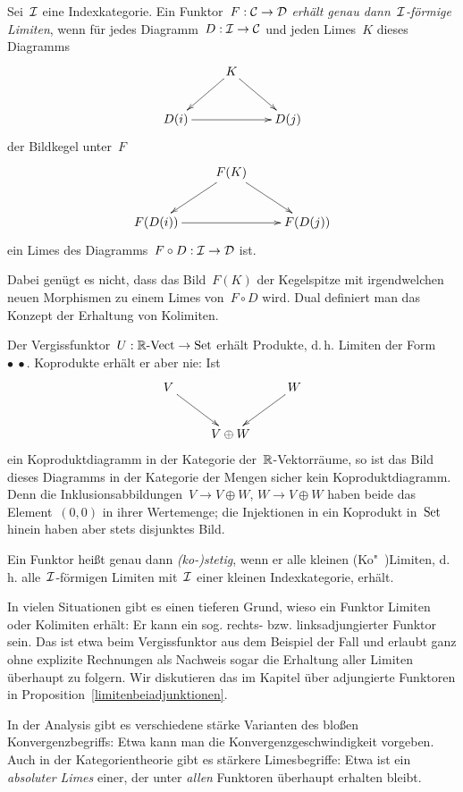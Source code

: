 \begin{defn}Sei~$\mathcal{I}$ eine Indexkategorie. Ein Funktor~$F:\mathcal{C}\to\mathcal{D}$ \emph{erhält
genau dann~$\mathcal{I}$-förmige Limiten}, wenn für jedes Diagramm~$D:\mathcal{I}\to\mathcal{C}$ und jeden
Limes~$K$ dieses Diagramms
\[ \xymatrix{
  & K \ar[ld] \ar[rd] \\
  D(i) \ar[rr] && D(j)
} \]
der Bildkegel unter~$F$
\[ \xymatrix{
  & F(K) \ar[ld] \ar[rd] \\
  F(D(i)) \ar[rr] && F(D(j))
} \]
ein Limes des Diagramms~$F \circ D : \mathcal{I} \to \mathcal{D}$ ist.
\end{defn}

Dabei genügt es nicht, dass das Bild~$F(K)$ der Kegelspitze mit irgendwelchen
neuen Morphismen zu einem Limes von~$F \circ D$ wird. Dual definiert man das
Konzept der Erhaltung von Kolimiten.

\begin{bsp}\label{vectvergiss}%
Der Vergissfunktor~$U : {\mathbb{R}\text{-}\mathrm{Vect}} \to \mathrm{Set}$ erhält Produkte, d.\,h.
Limiten der Form $\bullet\ \bullet$. Koprodukte erhält er aber nie: Ist
\[ \xymatrix{
  V \ar[rd] && W \ar[ld] \\
  & V \oplus W
} \]
ein Koproduktdiagramm in der Kategorie der~$\mathbb{R}$-Vektorräume, so ist das Bild
dieses Diagramms in der Kategorie der Mengen sicher kein Koproduktdiagramm.
Denn die Inklusionsabbildungen~$V \to V \oplus W$, $W \to V \oplus W$ haben
beide das Element~$(0,0)$ in ihrer Wertemenge; die Injektionen in ein
Koprodukt in~$\mathrm{Set}$ hinein haben aber stets disjunktes Bild.
\end{bsp}

\begin{defn}Ein Funktor heißt genau dann \emph{(ko-)stetig}, wenn er alle
kleinen (Ko"~)Li\-mi\-ten, d.\,h. alle~$\mathcal{I}$-förmigen Limiten mit~$\mathcal{I}$ einer kleinen
Indexkategorie, erhält.\end{defn}

In vielen Situationen gibt es einen tieferen Grund, wieso ein Funktor Limiten
oder Kolimiten erhält: Er kann ein sog. rechts- bzw. linksadjungierter Funktor
sein. Das ist etwa beim Vergissfunktor aus dem Beispiel der Fall und erlaubt
ganz ohne explizite Rechnungen als Nachweis sogar die Erhaltung aller Limiten
überhaupt zu folgern.  Wir diskutieren das im Kapitel über adjungierte
Funktoren in Proposition~\ref{limitenbeiadjunktionen}.

\begin{bem}In der Analysis gibt es verschiedene stärke Varianten des bloßen
Konvergenzbegriffs: Etwa kann man die Konvergenzgeschwindigkeit vorgeben.
Auch in der Kategorientheorie gibt es stärkere Limesbegriffe: Etwa ist ein
\emph{absoluter Limes} einer, der unter \emph{allen} Funktoren überhaupt
erhalten bleibt.\end{bem}


